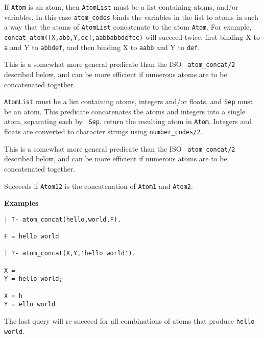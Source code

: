\begin{description}
If {\tt Atom} is an atom, then {\tt AtomList} must be a list
containing atoms, and/or variables.  In this case {\tt atom\_codes}
binds the variables in the list to atoms in such a way that the atoms
of {\tt AtomList} concatenate to the atom {\tt Atom}.  For example,
{\tt concat\_atom([X,abb,Y,cc],aabbabbdefcc)} will succeed twice,
first binding X to {\tt a} and Y to {\tt abbdef}, and then binding X
to {\tt aabb} and Y to {\tt def}.

This is a somewhat more general predicate than the ISO {\tt
  atom\_concat/2} described below, and can be more efficient if
numerous atoms are to be concatenated together.


{\tt AtomList} must be a list containing atoms, integers and/or
floats, and {\tt Sep} must be an atom.  This predicate concatenates
the atoms and integers into a single atom, separating each by {\tt
Sep}, return the resulting atom in {\tt Atom}.  Integers and floats
are converted to character strings using {\tt number\_codes/2}.

This is a somewhat more general predicate than the ISO {\tt
  atom\_concat/2} described below, and can be more efficient if
numerous atoms are to be concatenated together.

%
Succeeds if {\tt Atom12} is the concatenation of {\tt Atom1} and {\tt Atom2}.

{\bf Examples}
{\small
\begin{verbatim}
| ?- atom_concat(hello,world,F).

F = hello world

| ?- atom_concat(X,Y,'hello world').

X =
Y = hello world;

X = h
Y = ello world 
\end{verbatim}
}
The last query will re-succeed for all combinations of atoms that
produce {\tt hello world}.


\end{description}
